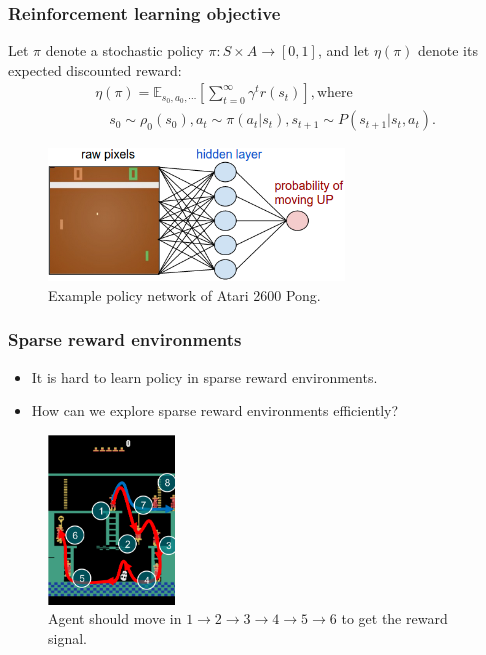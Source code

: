 \documentclass[10pt,mathserif]{beamer}
\begin{document}
\begin{frame}
\frametitle{Reinforcement learning objective}

	Let $\pi$ denote a stochastic policy $\pi : S \times A \rightarrow [0, 1]$, and let $\eta(\pi)$ denote its expected discounted reward:
	\begin{align*}
	&\eta(\pi) = \mathbb{E}_{s_0, a_0, \cdots} \left[ \sum_{t=0}^{\infty} \gamma^t r(s_t) \right], \text{where} \\
	&\quad s_0 \sim \rho_0(s_0), a_t \sim \pi(a_t | s_t), s_{t+1} \sim P(s_{t+1} | s_t, a_t).
	\end{align*}
  \begin{figure}[h]
        \centering
          \includegraphics[width=0.7\textwidth]{emi_figures/pg_policy}
          \caption{Example policy network of Atari 2600 Pong.}
  \end{figure}
\end{frame}


\begin{frame}
\frametitle{Sparse reward environments}
  \begin{itemize} \itemsep=6pt
      \item It is hard to learn policy in sparse reward environments.
      \item How can we explore sparse reward environments efficiently?
  \end{itemize}

  \begin{figure}[h]
        \centering
          \includegraphics[width=0.3\textwidth]{emi_figures/bc_montezuma}
          \caption{Agent should move in $1 \rightarrow 2 \rightarrow 3 \rightarrow 4 \rightarrow 5 \rightarrow 6$ to get the reward signal.}
  \end{figure}
\end{frame}
\end{document}
